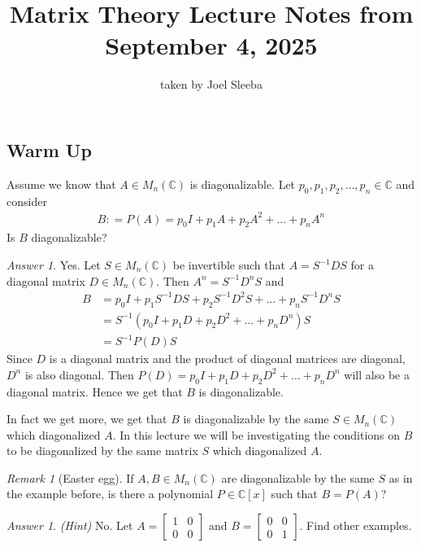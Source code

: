 \documentclass[12pt]{article}
\date{} %
\author{} %
\newcommand\lecdat{September 4, 2025} %
\newcommand\notesby{Joel Sleeba}%
\theoremstyle{definition}
\theoremstyle{remark}
\newtheorem{rem}[thm]{Remark}
\newtheorem{answer}[thm]{Answer}
\begin{document}
\title{Matrix Theory \linebreak
  Lecture Notes
from \lecdat}
\author{taken by \notesby}
\maketitle

\normalsize

\setcounter{section}{1}
\setcounter{subsection}{7}
\setcounter{thm}{28}

\subsection*{Warm Up}

Assume we know that $A \in M_n(\mathbb{C})$ is diagonalizable. Let
$p_0, p_1 , p_2 , \ldots , p_n \in \mathbb{C}$ and consider
\begin{align*}
  B: = P(A) = p_0 I + p_1 A + p_2A^2 + \ldots + p_nA^n
\end{align*}
Is $B$ diagonalizable?
\begin{answer}
  Yes. Let $S \in M_n(\mathbb{C})$ be invertible such that $A =
  S^{-1}DS$ for a diagonal matrix $D \in M_n(\mathbb{C})$. Then $A^n =
  S^{-1}D^n S$ and
  \begin{align*}
    B &= p_0 I  + p_1S^{-1}DS + p_2S^{-1}D^2S + \ldots + p_nS^{-1}D^nS \\
    &= S^{-1} (p_0 I  + p_1D + p_2D^2 + \ldots + p_nD^n)S \\
    &= S^{-1}P(D)S
  \end{align*}
  Since $D$ is a diagonal matrix and the product of diagonal matrices
  are diagonal, $D^n$ is also diagonal. Then $P(D) = p_0 I  + p_1D +
  p_2D^2 + \ldots + p_nD^n$ will also be a diagonal matrix. Hence we
  get that $B$ is diagonalizable.

  In fact we get more, we get that $B$ is diagonalizable by the same
  $S \in M_n(\mathbb{C})$ which diagonalized $A$. In this lecture we
  will be investigating the conditions on $B$ to be diagonalized by
  the same matrix $S$ which diagonalized $A$.
\end{answer}

\begin{rem}[Easter egg]
  If $A, B \in M_n(\mathbb{C})$ are diagonalizable by the same $S$ as
  in the example before, is there a polynomial $P \in \mathbb{C}[x]$
  such that $B = P(A)$?
\end{rem}
\begin{answer}
  \textit{(Hint)} No. Let $A =
  \begin{bmatrix}%
    1 & 0 \\
    0 & 0
  \end{bmatrix}$ and $B =
  \begin{bmatrix}%
    0 & 0 \\
    0 & 1
  \end{bmatrix}$. Find other examples.
\end{answer}
\end{document}
